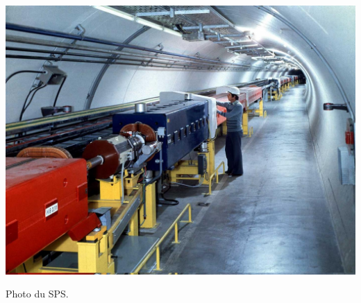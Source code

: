 \marginpar
{
	
	\includegraphics[width=\marginparwidth]{LHC/sps.jpg}
    \captionsetup{type=figure}\caption{Photo du SPS.}
    	\label{sps}
}
